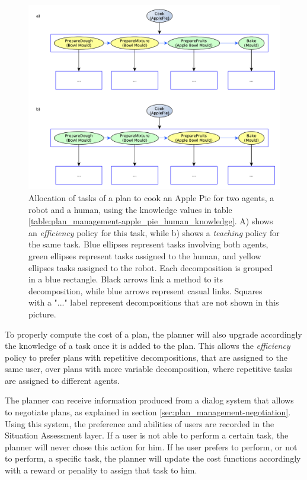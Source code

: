 \begin{figure}[ht!]
 \centering
  \includegraphics[scale=0.5]{img/plan_management/adapting_plan_knowledge.pdf}
 \caption[Allocation of tasks of a plan to cook an Apple Pie for two agents]{Allocation of tasks of a plan to cook an Apple Pie for two agents, a robot and a human, using the knowledge values in table \ref{table:plan_management-apple_pie_human_knowledge}. A) shows an \textit{efficiency} policy for this task, while b) shows a \textit{teaching} policy for the same task. Blue ellipses represent tasks involving both agents, green ellipses represent tasks assigned to the human, and yellow ellipses tasks assigned to the robot. Each decomposition is grouped in a blue rectangle. Black arrows link a method to its decomposition, while blue arrows represent casual links. Squares with a "..." label represent decompositions that are not shown in this picture.}
 \label{fig:plan_management-adapting_plan_knowledge}
 \end{figure}



To properly compute the cost of a plan, the planner will also upgrade accordingly the knowledge of a task once it is added to the plan. This allows the \textit{efficiency} policy to prefer plans with repetitive decompositions, that are assigned to the same user, over plans with more variable decomposition, where repetitive tasks are assigned to different agents.

The planner can receive information produced from a dialog system that allows to negotiate plans, as explained in section \ref{sec:plan_management-negotiation}. Using this system, the preference and abilities of users are recorded in the Situation Assessment layer. 
If a user is not able to perform a certain task, the planner will never chose this action for him. If he user prefers to perform, or not to perform, a specific task, the planner will update the cost functions accordingly with a reward or penality to assign that task to him.


